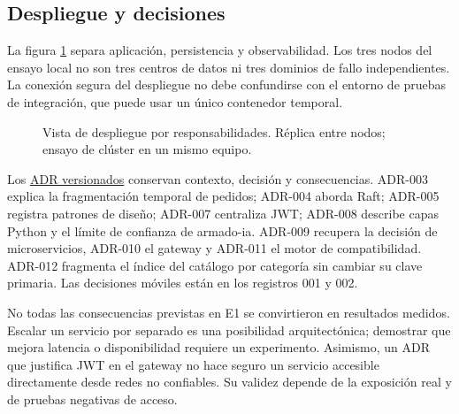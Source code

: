 \documentclass[12pt,a4paper]{article}
\newcommand{\evidencia}[2]{\href{https://github.com/JoseLozanoMorales/TiendaTech/blob/c5dca588ea9662cab56732c97fe644b9a929854b/#1}{#2}}
\begin{document}
\subsection{Despliegue y decisiones}
La figura \ref{fig:despliegue} separa aplicación, persistencia y observabilidad. Los tres nodos del ensayo local no son tres centros de datos ni tres dominios de fallo independientes. La conexión segura del despliegue no debe confundirse con el entorno de pruebas de integración, que puede usar un único contenedor temporal.

\begin{figure}[H]\centering
{}
\caption{Vista de despliegue por responsabilidades. Réplica entre nodos; ensayo de clúster en un mismo equipo.}\label{fig:despliegue}
\end{figure}

Los \evidencia{docs/adr}{ADR versionados} conservan contexto, decisión y consecuencias. ADR-003 explica la fragmentación temporal de pedidos; ADR-004 aborda Raft; ADR-005 registra patrones de diseño; ADR-007 centraliza JWT; ADR-008 describe capas Python y el límite de confianza de armado-ia. ADR-009 recupera la decisión de microservicios, ADR-010 el gateway y ADR-011 el motor de compatibilidad. ADR-012 fragmenta el índice del catálogo por categoría sin cambiar su clave primaria. Las decisiones móviles están en los registros 001 y 002.

No todas las consecuencias previstas en E1 se convirtieron en resultados medidos. Escalar un servicio por separado es una posibilidad arquitectónica; demostrar que mejora latencia o disponibilidad requiere un experimento. Asimismo, un ADR que justifica JWT en el gateway no hace seguro un servicio accesible directamente desde redes no confiables. Su validez depende de la exposición real y de pruebas negativas de acceso.
\end{document}
